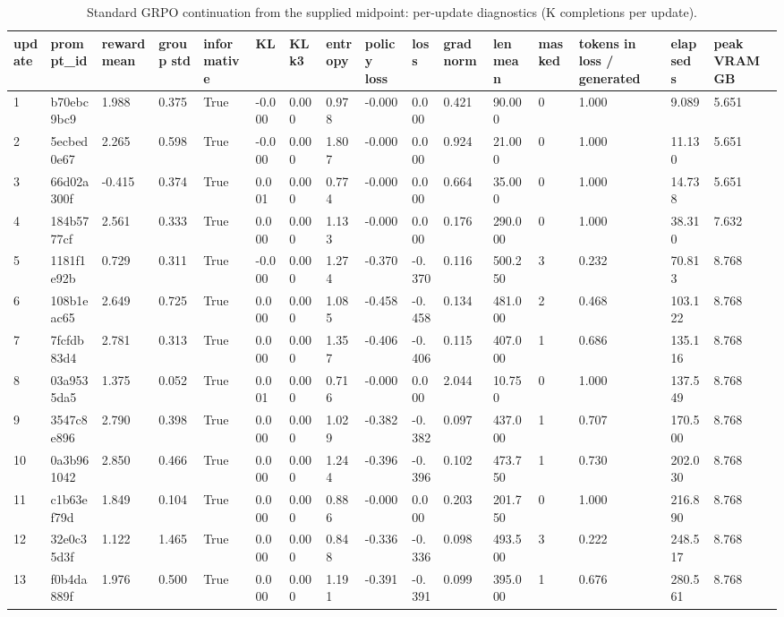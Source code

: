 \begin{table}[t]
\centering
\small
\caption{Standard GRPO continuation from the supplied midpoint: per-update diagnostics (K completions per update).}
\begin{tabular}{llllllllllllllll}
\toprule
update & prompt\_id & reward mean & group std & informative & KL & KL k3 & entropy & policy loss & loss & grad norm & len mean & masked & tokens in loss / generated & elapsed s & peak VRAM GB \\
\midrule
1 & b70ebc9bc9 & 1.988 & 0.375 & True & -0.000 & 0.000 & 0.978 & -0.000 & 0.000 & 0.421 & 90.000 & 0 & 1.000 & 9.089 & 5.651 \\
2 & 5ecbed0e67 & 2.265 & 0.598 & True & -0.000 & 0.000 & 1.807 & -0.000 & 0.000 & 0.924 & 21.000 & 0 & 1.000 & 11.130 & 5.651 \\
3 & 66d02a300f & -0.415 & 0.374 & True & 0.001 & 0.000 & 0.774 & -0.000 & 0.000 & 0.664 & 35.000 & 0 & 1.000 & 14.738 & 5.651 \\
4 & 184b5777cf & 2.561 & 0.333 & True & 0.000 & 0.000 & 1.133 & -0.000 & 0.000 & 0.176 & 290.000 & 0 & 1.000 & 38.310 & 7.632 \\
5 & 1181f1e92b & 0.729 & 0.311 & True & -0.000 & 0.000 & 1.274 & -0.370 & -0.370 & 0.116 & 500.250 & 3 & 0.232 & 70.813 & 8.768 \\
6 & 108b1eac65 & 2.649 & 0.725 & True & 0.000 & 0.000 & 1.085 & -0.458 & -0.458 & 0.134 & 481.000 & 2 & 0.468 & 103.122 & 8.768 \\
7 & 7fcfdb83d4 & 2.781 & 0.313 & True & 0.000 & 0.000 & 1.357 & -0.406 & -0.406 & 0.115 & 407.000 & 1 & 0.686 & 135.116 & 8.768 \\
8 & 03a9535da5 & 1.375 & 0.052 & True & 0.001 & 0.000 & 0.716 & -0.000 & 0.000 & 2.044 & 10.750 & 0 & 1.000 & 137.549 & 8.768 \\
9 & 3547c8e896 & 2.790 & 0.398 & True & 0.000 & 0.000 & 1.029 & -0.382 & -0.382 & 0.097 & 437.000 & 1 & 0.707 & 170.500 & 8.768 \\
10 & 0a3b961042 & 2.850 & 0.466 & True & 0.000 & 0.000 & 1.244 & -0.396 & -0.396 & 0.102 & 473.750 & 1 & 0.730 & 202.030 & 8.768 \\
11 & c1b63ef79d & 1.849 & 0.104 & True & 0.000 & 0.000 & 0.886 & -0.000 & 0.000 & 0.203 & 201.750 & 0 & 1.000 & 216.890 & 8.768 \\
12 & 32e0c35d3f & 1.122 & 1.465 & True & 0.000 & 0.000 & 0.848 & -0.336 & -0.336 & 0.098 & 493.500 & 3 & 0.222 & 248.517 & 8.768 \\
13 & f0b4da889f & 1.976 & 0.500 & True & 0.000 & 0.000 & 1.191 & -0.391 & -0.391 & 0.099 & 395.000 & 1 & 0.676 & 280.561 & 8.768 \\

\end{tabular}
\end{table}
